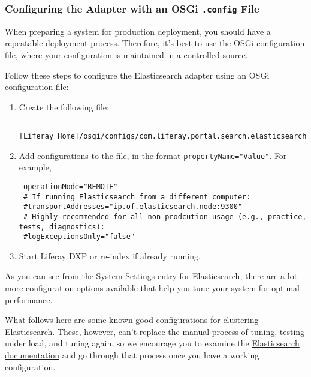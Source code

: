 \noindent\hrulefill

\subsubsection{\texorpdfstring{Configuring the Adapter with an OSGi
\texttt{.config}
File}{Configuring the Adapter with an OSGi .config File}}\label{configuring-the-adapter-with-an-osgi-.config-file-1}

When preparing a system for production deployment, you should have a
repeatable deployment process. Therefore, it's best to use the OSGi
configuration file, where your configuration is maintained in a
controlled source.

Follow these steps to configure the Elasticsearch adapter using an OSGi
configuration file:

\begin{enumerate}
\def\labelenumi{\arabic{enumi}.}
\item
  Create the following file:

\begin{verbatim}
 [Liferay_Home]/osgi/configs/com.liferay.portal.search.elasticsearch6.configuration.ElasticsearchConfiguration.config
\end{verbatim}
\item
  Add configurations to the file, in the format
  \texttt{propertyName="Value"}. For example,

\begin{verbatim}
 operationMode="REMOTE"
 # If running Elasticsearch from a different computer:
 #transportAddresses="ip.of.elasticsearch.node:9300"
 # Highly recommended for all non-prodcution usage (e.g., practice, tests, diagnostics):
 #logExceptionsOnly="false"
\end{verbatim}
\item
  Start Liferay DXP or re-index if already running.
\end{enumerate}

As you can see from the System Settings entry for Elasticsearch, there
are a lot more configuration options available that help you tune your
system for optimal performance.

What follows here are some known good configurations for clustering
Elasticsearch. These, however, can't replace the manual process of
tuning, testing under load, and tuning again, so we encourage you to
examine the
\href{https://www.elastic.co/guide/en/elasticsearch/reference/6.1/important-settings.html}{Elasticsearch
documentation} and go through that process once you have a working
configuration.


